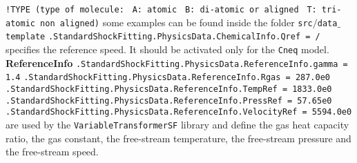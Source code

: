 \documentclass[11pt,a4paper,oneside]{article}
\begin{document}
\newline
\hspace*{1.2cm}
\texttt{!TYPE \hspace*{2cm} (type of molecule:}
\newline
\texttt{\hspace*{6cm} A: atomic}
\newline
\texttt{\hspace*{6cm} B: di-atomic or aligned}
\newline
\texttt{\hspace*{6cm} T: tri-atomic non aligned)}
\newline
\newline
some examples can be found inside the folder \texttt{src$/$data$\_$template}
\newline
\newline
\hspace*{1cm} \texttt{.StandardShockFitting.PhysicsData.ChemicalInfo.Qref = /}
\newline
\newline
specifies the reference speed. It should be activated only for the \texttt{Cneq} model.
\newline
\newline
\textbf{ReferenceInfo}
\newline
\newline
\hspace*{1cm} \texttt{.StandardShockFitting.PhysicsData.ReferenceInfo.gamma = 1.4}
\newline
\hspace*{1cm}  \texttt{.StandardShockFitting.PhysicsData.ReferenceInfo.Rgas = 287.0e0}
\newline
\hspace*{1cm} \texttt{.StandardShockFitting.PhysicsData.ReferenceInfo.TempRef = 1833.0e0}
\newline
\hspace*{1cm} \texttt{.StandardShockFitting.PhysicsData.ReferenceInfo.PressRef = 57.65e0}
\newline
\hspace*{1cm} \texttt{.StandardShockFitting.PhysicsData.ReferenceInfo.VelocityRef = 5594.0e0}
\newline
\newline
are used by the \texttt{VariableTransformerSF} library and define the gas heat capacity ratio, the gas constant, the free-stream temperature, the free-stream pressure and the free-stream speed.
\newline
\newline
\end{document}
